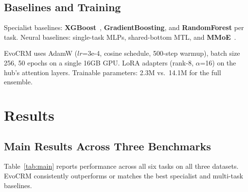 \documentclass[10pt,twocolumn]{article}
\begin{document}
\subsection{Baselines and Training}

Specialist baselines: \textbf{XGBoost}~\cite{chen2016xgboost}, \textbf{GradientBoosting}, and \textbf{RandomForest} per task. Neural baselines: single-task MLPs, shared-bottom MTL, and \textbf{MMoE}~\cite{ma2018mmoe}.

EvoCRM uses AdamW ($lr$=3e-4, cosine schedule, 500-step warmup), batch size 256, 50 epochs on a single 16GB GPU. LoRA adapters (rank-8, $\alpha$=16) on the hub's attention layers. Trainable parameters: 2.3M vs.\ 14.1M for the full ensemble.

\section{Results}
\enlargethispage{1.5\baselineskip}

\subsection{Main Results Across Three Benchmarks}

Table~\ref{tab:main} reports performance across all six tasks on all three datasets. EvoCRM consistently outperforms or matches the best specialist and multi-task baselines.
\end{document}
